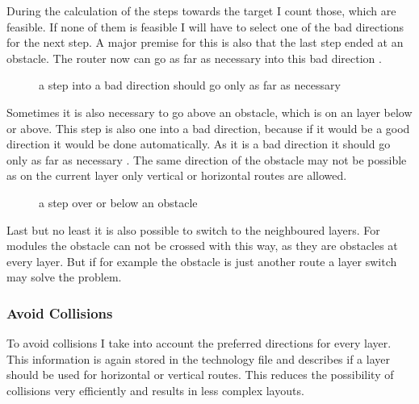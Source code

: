 During the calculation of the steps towards the target I count those, which are feasible. If none of them is feasible I will have to select one of the bad directions for the next step. A major premise for this is also that the last step ended at an obstacle. The router now can go as far as necessary into this bad direction .

\begin{figure}
	\centering
	
 	\caption{a step into a bad direction should go only as far as necessary}
	\label{fig:router_as_far_as_necessary}
\end{figure}

Sometimes it is also necessary to go above an obstacle, which is on an layer below or above. This step is also one into a bad direction, because if it would be a good direction it would be done automatically. As it is a bad direction it should go only as far as necessary . The same direction of the obstacle may not be possible as on the current layer only vertical or horizontal routes are allowed.

\begin{figure}
	\centering
	
 	\caption{a step over or below an obstacle}
	\label{fig:router_as_far_as_necessary_above}
\end{figure}

Last but no least it is also possible to switch to the neighboured layers. For modules the obstacle can not be crossed with this way, as they are obstacles at every layer. But if for example the obstacle is just another route a layer switch may solve the problem.

\subsubsection{Avoid Collisions}
To avoid collisions I take into account the preferred directions for every layer. This information is again stored in the technology file and describes if a layer should be used for horizontal or vertical routes. This reduces the possibility of collisions very efficiently and results in less complex layouts.

